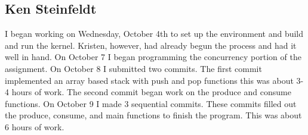 \documentclass[10pt,letterpaper,onecolumn,draftclsnofoot]{IEEEtran}
\begin{document}
\subsection{Ken Steinfeldt}
I began working on Wednesday, October 4th to set up the environment and build
and run the kernel. Kristen, however, had already begun the process and had it
well in hand. On October 7 I began programming the concurrency portion of the 
assignment. On October 8 I submitted two commits. The first commit implemented 
an array based stack with push and pop functions this was about 3-4 hours of 
work. The second commit began work on the produce and consume functions. On 
October 9 I made 3 sequential commits. These commits filled out the produce, 
consume, and main functions to finish the program. This was about 6 hours of work.
\end{document}
